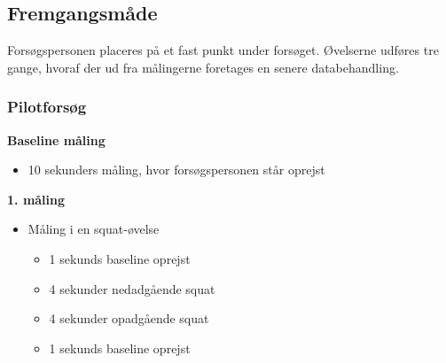 \subsection{Fremgangsmåde}
Forsøgspersonen placeres på et fast punkt under forsøget. Øvelserne udføres tre gange, hvoraf der ud fra målingerne foretages en senere databehandling. 

\subsubsection{Pilotforsøg}
\textbf{Baseline måling}
\begin{itemize}
\item 10 sekunders måling, hvor forsøgspersonen står oprejst
\end{itemize}
	
\textbf{1. måling}
\begin{itemize}
\item Måling i en squat-øvelse
	\begin{itemize}
	\item 1 sekunds baseline oprejst
	\item 4 sekunder nedadgående squat 
	\item 4 sekunder opadgående squat
	\item 1 sekunds baseline oprejst
	\end{itemize}
\end{itemize}


